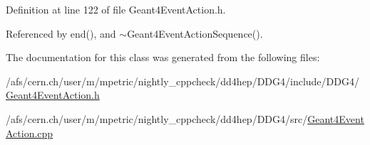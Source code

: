 Definition at line 122 of file Geant4\+Event\+Action.\+h.



Referenced by end(), and $\sim$\+Geant4\+Event\+Action\+Sequence().



The documentation for this class was generated from the following files\+:\begin{DoxyCompactItemize}
\item 
/afs/cern.\+ch/user/m/mpetric/nightly\+\_\+cppcheck/dd4hep/\+D\+D\+G4/include/\+D\+D\+G4/\hyperlink{_geant4_event_action_8h}{Geant4\+Event\+Action.\+h}\item 
/afs/cern.\+ch/user/m/mpetric/nightly\+\_\+cppcheck/dd4hep/\+D\+D\+G4/src/\hyperlink{_geant4_event_action_8cpp}{Geant4\+Event\+Action.\+cpp}\end{DoxyCompactItemize}
